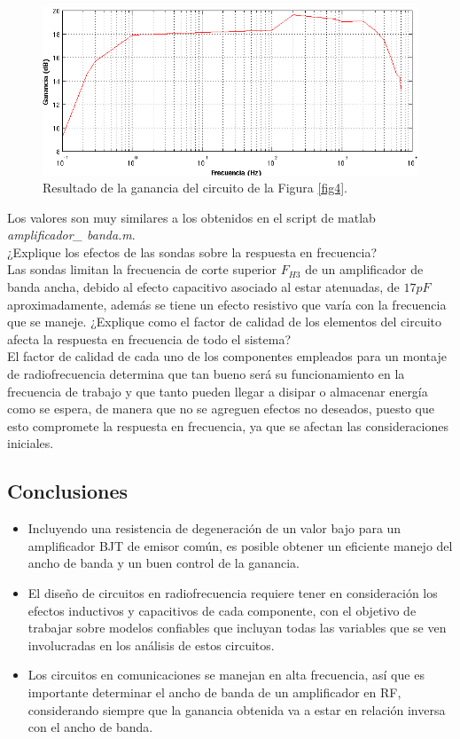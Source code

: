 \documentclass[11pt,graphicx,caption,rotating]{article}
\begin{document}
\begin{figure}[H]
	\centering
		\includegraphics[scale=0.65]{resultado_ganancia.png}
	\caption{Resultado de la ganancia del circuito de la Figura \ref{fig4}.}
	\label{fig7}
\end{figure}
\noindent
Los valores son muy similares a los obtenidos en el script de matlab \textit{amplificador\_ banda.m}.\\
¿Explique los efectos de las sondas sobre la respuesta en frecuencia?\\
Las sondas limitan la frecuencia de corte superior $F_{H3}$ de un amplificador de banda ancha, debido al efecto capacitivo asociado al estar atenuadas, de $17 pF$ aproximadamente, además se tiene un efecto resistivo que varía con la frecuencia que se maneje.
¿Explique como el factor de calidad de los elementos del circuito afecta la respuesta en frecuencia de todo
el sistema?\\
El factor de calidad de cada uno de los componentes empleados para un montaje de radiofrecuencia  determina que tan bueno será su funcionamiento en la frecuencia de trabajo y que tanto pueden llegar a disipar o almacenar energía como se espera, de manera que no se agreguen efectos no deseados, puesto que esto compromete la respuesta en frecuencia, ya que se afectan las consideraciones iniciales.

\subsection{Conclusiones}
\begin{itemize}
 \item Incluyendo una resistencia de degeneración de un valor bajo para un amplificador BJT de emisor común, es posible obtener un eficiente manejo del ancho de banda y un buen control de la ganancia.
 \item El diseño de circuitos en radiofrecuencia requiere tener en consideración los efectos inductivos y capacitivos de cada componente, con el objetivo de trabajar sobre modelos confiables que incluyan todas las variables que se ven involucradas en los análisis de estos circuitos.
 \item Los circuitos en comunicaciones se manejan en alta frecuencia, así que es importante determinar el ancho de banda de un amplificador en RF, considerando siempre que la ganancia obtenida va a estar en relación inversa con el ancho de banda.
\end{itemize}
\end{document}
